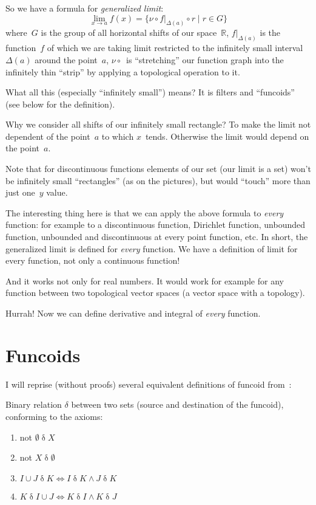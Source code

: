 So we have a formula for \emph{generalized limit}:
\[ \lim_{x\to a} f(x) =
\{ \nu \circ f|_{\Delta(a)} \circ r \mid r\in G \} \]
where~$G$ is the group of all horizontal shifts of our space~$\mathbb{R}$, $f|_{\Delta(a)}$ is the function~$f$ of which we are taking limit restricted to the infinitely small interval~$\Delta(a)$ around the point~$a$, $\nu\circ{}$~is ``stretching'' our function graph into the infinitely thin ``strip'' by applying a topological operation to it.

What all this (especially ``infinitely small'') means? It is filters and ``funcoids'' (see below for the definition).

Why we consider all shifts of our infinitely small rectangle? To make the limit not dependent of the point~$a$ to which $x$~tends. Otherwise the limit would depend on the point~$a$.

Note that for discontinuous functions elements of our set (our limit is a set) won't be infinitely small ``rectangles'' (as on the pictures), but would ``touch'' more than just one~$y$ value.

The interesting thing here is that we can apply the above formula to \emph{every} function: for example to a discontinuous function, Dirichlet function, unbounded function, unbounded and discontinuous at every point function, etc. In short, the generalized limit is defined for \emph{every} function. We have a definition of limit for every function, not only a continuous function!

And it works not only for real numbers. It would work for example for any function between two topological vector spaces (a vector space with a topology).

Hurrah! Now we can define derivative and integral of \emph{every} function.

\chapter{Funcoids}

I will reprise (without proofs) several equivalent definitions of funcoid from~\cite{volume-1-edition1}:

Binary relation $\delta$ between two sets (source and destination of the funcoid), conforming to the axioms:

\begin{enumerate}
\item not $\emptyset\mathrel{\delta}X$
\item not $X\mathrel{\delta}\emptyset$
\item $I\cup J \mathrel{\delta} K\iff I \mathrel{\delta}K\wedge J\mathrel{\delta}K$
\item $K\mathrel{\delta}I\cup J\iff K \mathrel{\delta}I\wedge K\mathrel{\delta}J$
\end{enumerate}

